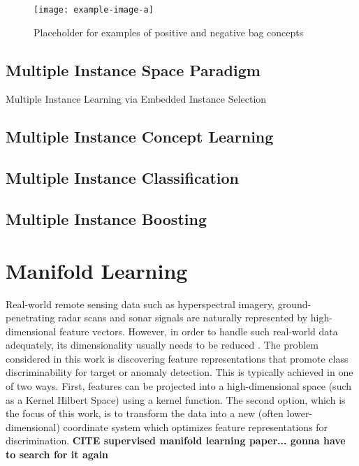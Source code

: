 \begin{center}
	\begin{figure*}[h]
		\centering
		\texttt{[image: example-image-a]}
		\caption[Multiple instance learning bags.]{Placeholder for examples of positive and negative bag concepts}
		\label{fig:bag_eg}
	\end{figure*}
\end{center}

\subsection{Multiple Instance Space Paradigm}
Multiple Instance Learning via Embedded Instance Selection

\subsection{Multiple Instance Concept Learning}

\subsection{Multiple Instance Classification}

\subsection{Multiple Instance Boosting}



\section{Manifold Learning}

Real-world remote sensing data such as hyperspectral imagery, ground-penetrating radar scans and sonar signals are naturally represented by high-dimensional feature vectors.  However, in order to handle such real-world data adequately, its dimensionality usually needs to be reduced \cite{VanDerMaaten2009DRReview,Belkin2004SemiSupLearningRiemannianManifolds}. The problem considered in this work is discovering feature representations that promote class discriminability for target or anomaly detection.  This is typically achieved in one of two ways.  First, features can be projected into a high-dimensional space (such as a Kernel Hilbert Space) using a kernel function. The second option, which is the focus of this work, is to transform the data into a new (often lower-dimensional) coordinate system which optimizes feature representations for discrimination. \textbf{CITE supervised manifold learning paper... gonna have to search for it again}

